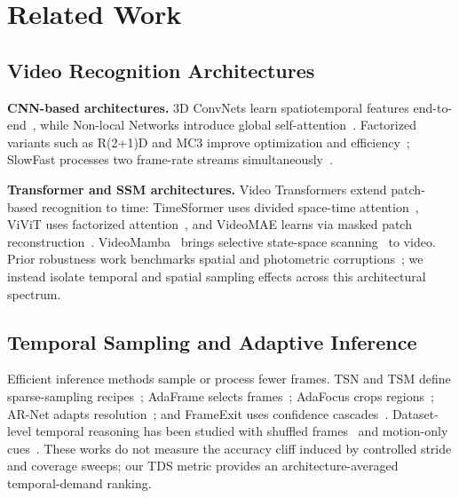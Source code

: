 \documentclass[a4paper, 10pt, conference]{ieeeconf}
\newcommand{\TDS}{\textsc{TDS}}
\begin{document}
\section{Related Work}
\label{sec:related}

\subsection{Video Recognition Architectures}

\textbf{CNN-based architectures.} 3D ConvNets learn spatiotemporal features end-to-end~\cite{tran2015c3d,carreira2017i3d}, while Non-local Networks introduce global self-attention~\cite{wang2018nonlocal}. Factorized variants such as R(2+1)D and MC3 improve optimization and efficiency~\cite{tran2018r2plus1d,tran2019video}; SlowFast processes two frame-rate streams simultaneously~\cite{feichtenhofer2019slowfast}.

\textbf{Transformer and SSM architectures.} Video Transformers extend patch-based recognition to time: TimeSformer uses divided space-time attention~\cite{bertasius2021timesformer}, ViViT uses factorized attention~\cite{arnab2021vivit}, and VideoMAE learns via masked patch reconstruction~\cite{tong2022videomae,wang2023videomaev2}. VideoMamba~\cite{li2024videomamba} brings selective state-space scanning~\cite{gu2023mamba,dao2024mamba2} to video. Prior robustness work benchmarks spatial and photometric corruptions~\cite{schiappa2023robustness}; we instead isolate temporal and spatial sampling effects across this architectural spectrum.

\subsection{Temporal Sampling and Adaptive Inference}

Efficient inference methods sample or process fewer frames. TSN and TSM define sparse-sampling recipes~\cite{wang2016tsn,lin2019tsm}; AdaFrame selects frames~\cite{wu2019adaframe}; AdaFocus crops regions~\cite{wang2021adafocus}; AR-Net adapts resolution~\cite{meng2020arnet}; and FrameExit uses confidence cascades~\cite{ghodrati2021frameexit}. Dataset-level temporal reasoning has been studied with shuffled frames~\cite{huang2018makes} and motion-only cues~\cite{sevilla2021only}. These works do not measure the accuracy cliff induced by controlled stride and coverage sweeps; our \TDS{} metric provides an architecture-averaged temporal-demand ranking.
\end{document}
